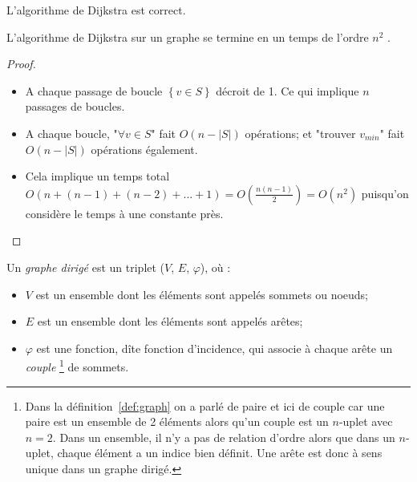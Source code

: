 \begin{mycorr} 
  L’algorithme de Dijkstra est correct.
\end{mycorr}

\begin{mytheo} 
  L’algorithme de Dijkstra sur un graphe se termine en un temps de l’ordre $n^2$ .
  \begin{proof}
    \noindent
    \begin{itemize}
		\item A chaque passage de boucle $\left\lbrace v \in S \right\rbrace $ décroit de 1. Ce qui implique $n$ passages de boucles.
		\item A chaque boucle, "$\forall v \in S$" fait $O(n-|S|)$ opérations; et "trouver $v_{min}$" fait $O(n-|S|)$ opérations également.
		\item Cela implique un temps total $O(n + (n-1) + (n-2) + ... + 1) = O\left( \frac{n(n-1)}{2} \right) = O(n^2)$ puisqu'on considère le temps à une constante près.
		\end{itemize}
  \end{proof}
\end{mytheo}

\begin{mydef}
  Un \emph{graphe dirigé} est un triplet ($V$, $E$, $\varphi$), où :
  \begin{itemize}
    \item $V$ est un ensemble dont les éléments sont appelés sommets ou noeuds;
    \item $E$ est un ensemble dont les éléments sont appelés arêtes;
    \item $\varphi$ est une fonction, dîte fonction d'incidence, qui associe à chaque arête un \emph{couple}
      \footnote{Dans la définition~\ref{def:graph} on a parlé de paire et ici de couple car une paire est
        un ensemble de 2 éléments alors qu'un couple est un $n$-uplet avec $n = 2$.
        Dans un ensemble, il n'y a pas de relation d'ordre alors que dans un $n$-uplet,
        chaque élément a un indice bien définit.
        Une arête est donc à sens unique dans un graphe dirigé.}
      de sommets.
  \end{itemize}
\end{mydef}

